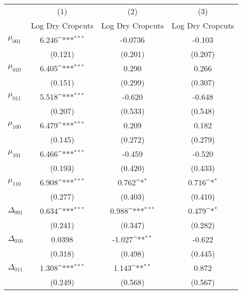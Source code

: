 {
\def\sym#1{\ifmmode^{#1}\else\(^{#1}\)\fi}
\begin{tabular}{l*{3}{c}}
\hline\hline
            &\multicolumn{1}{c}{(1)}&\multicolumn{1}{c}{(2)}&\multicolumn{1}{c}{(3)}\\
            &\multicolumn{1}{c}{Log Dry Cropcuts}&\multicolumn{1}{c}{Log Dry Cropcuts}&\multicolumn{1}{c}{Log Dry Cropcuts}\\
\hline
$\mu_{001}$ &       6.246\sym{***}&     -0.0736         &      -0.103         \\
            &     (0.121)         &     (0.201)         &     (0.207)         \\
[1em]
$\mu_{010}$ &       6.405\sym{***}&       0.290         &       0.266         \\
            &     (0.151)         &     (0.299)         &     (0.307)         \\
[1em]
$\mu_{011}$ &       5.518\sym{***}&      -0.620         &      -0.648         \\
            &     (0.207)         &     (0.533)         &     (0.548)         \\
[1em]
$\mu_{100}$ &       6.479\sym{***}&       0.209         &       0.182         \\
            &     (0.145)         &     (0.272)         &     (0.279)         \\
[1em]
$\mu_{101}$ &       6.466\sym{***}&      -0.459         &      -0.520         \\
            &     (0.193)         &     (0.420)         &     (0.433)         \\
[1em]
$\mu_{110}$ &       6.908\sym{***}&       0.762\sym{*}  &       0.716\sym{*}  \\
            &     (0.277)         &     (0.403)         &     (0.410)         \\
[1em]
$\Delta_{001}$&       0.634\sym{***}&       0.988\sym{***}&       0.479\sym{*}  \\
            &     (0.241)         &     (0.347)         &     (0.282)         \\
[1em]
$\Delta_{010}$&      0.0398         &      -1.027\sym{**} &      -0.622         \\
            &     (0.318)         &     (0.498)         &     (0.445)         \\
[1em]
$\Delta_{011}$&       1.308\sym{***}&       1.143\sym{**} &       0.872         \\
            &     (0.249)         &     (0.568)         &     (0.567)         \\

\end{tabular}}
